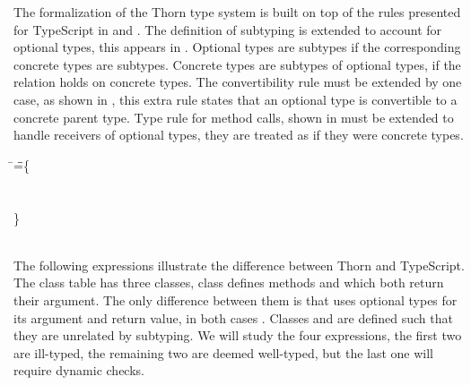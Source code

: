 \documentclass[acmsmall, anonymous, authordraft, review]{acmart} %
\begin{document}
The formalization of the Thorn type system is built on top of the rules
presented for TypeScript in  and . The
definition of subtyping is extended to account for optional types, this 
appears in . Optional types are subtypes if the corresponding
concrete types are subtypes. Concrete types are subtypes of optional types,
if the relation holds on concrete types. The convertibility rule must be
extended by one case, as shown in , this extra rule states
that an optional type is convertible to a concrete parent type. Type rule
for method calls, shown in  must be extended to handle
receivers of optional types, they are treated as if they were concrete
types.

\medskip
\small
\begin{tabbing}
\HS\HS\HS\=  
\Call{\New\A{}}\n{\New\D{}}\HS\HS\HS\HS\HS\HS\HS\HS\HS\HS\HS\HS\HS \WHERE \HS\K\HS=\HS\=\class\= \A \{
\\\>
\Call{\New\A{}}\m{\New\D{}}
  \>    \HS  \Mdef \n\x\C\C{~\x~}
\\\>
\Call{\New\A{}}\m{\Call{\New\A{}}\n{\New\C{}}}
  \>    \HS \Mdef \m\x{\dt\C} {\dt\C}{~\x~}
\\\>
\Call{\New\A{}}\n{\Call{\New\A{}}\m{\New\C{}}}
  \> \}
  \\\>   \> \Class\C{}{\Mdef\mp\x\any\any\x}
  \\\>   \> \Class\D{}{\Mdef\m\x\any\any\x}


\end{tabbing}
\medskip

\normalsize

The following expressions illustrate the difference between Thorn and
TypeScript.  The class table \K has three classes, class \A defines methods
\m and \n which both return their argument. The only difference between them
is that \m uses optional types for its argument and return value, in both
cases \CW.  Classes \C and \D are defined such that they are unrelated by
subtyping. We will study the four expressions, the first two are ill-typed,
the remaining two are deemed well-typed, but the last one will require
dynamic checks.
\end{document}
